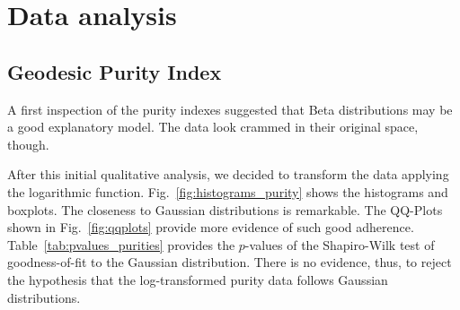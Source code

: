 \documentclass[12pt]{article}
\begin{document}
\section{Data analysis}

\subsection{Geodesic Purity Index}

A first inspection of the purity indexes suggested that Beta distributions may be a good explanatory model.
The data look crammed in their original space, though.

After this initial qualitative analysis, we decided to transform the data applying the logarithmic function.
Fig.~\ref{fig:histograms_purity} shows the histograms and boxplots. 
The closeness to Gaussian distributions is remarkable.
The QQ-Plots shown in Fig.~\ref{fig:qqplots} provide more evidence of such good adherence.
Table~\ref{tab:pvalues_purities} provides the $p$-values of the Shapiro-Wilk test of goodness-of-fit to the Gaussian distribution.
There is no evidence, thus, to reject the hypothesis that the log-transformed purity data follows Gaussian distributions.
\end{document}
